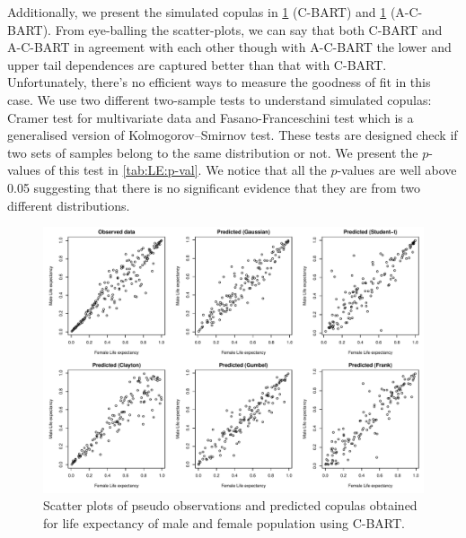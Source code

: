\documentclass{amsart}
\begin{document}
Additionally, we present the simulated copulas in \cref{fig:pseudo:LE:woa} (C-BART) and \cref{fig:pseudo:LE:woa} (A-C-BART). From eye-balling the scatter-plots, we can say that both C-BART and A-C-BART in agreement with each other though with A-C-BART the lower and upper tail dependences are captured better than that with C-BART. Unfortunately, there's no efficient ways to measure the goodness of fit in this case. We use two different two-sample tests to understand simulated copulas: Cramer test for multivariate data \cite{BARINGHAUS2004190} and Fasano-Franceschini test \cite{fasano-franceschini} which is a generalised version of Kolmogorov–Smirnov test. These tests are designed check if two sets of samples belong to the same distribution or not. We present the $p$-values of this test in \cref{tab:LE:p-val}. We notice that all the $p$-values are well above 0.05 suggesting that there is no significant evidence that they are from two different distributions.


\begin{figure}
	\centering
	\includegraphics[width = 0.95\linewidth]{"LE_vs_GDP_woa.pdf"}
	\caption{Scatter plots of pseudo observations and predicted copulas obtained for life expectancy of male and female population using C-BART.}
	\label{fig:pseudo:LE:woa}
\end{figure}
\end{document}

